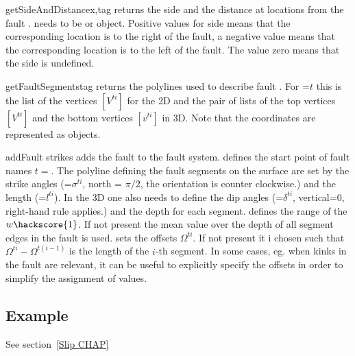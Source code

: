 \begin{methoddesc}[FaultSystem]{getSideAndDistance}{x,tag}
returns the side and the distance at locations  from the fault .
 needs to be \Vector or \numpyNDA object. Positive values for side means that the corresponding location is 
to the right of the fault, a negative value means that the corresponding location is 
to the left of the fault. The value zero means that the side is undefined.
\end{methoddesc}




\begin{methoddesc}[FaultSystem]{getFaultSegments}{tag}
returns the polylines used to describe fault . For =$t$ this is the list of the vertices
$[V^{ti}]$ for the 2D and the pair of lists of the top vertices $[V^{ti}]$ and the bottom vertices  $[v^{ti}]$ in 3D.
Note that the coordinates are represented as \numpyNDA objects.
\end{methoddesc}

\begin{methoddesc}[FaultSystem]{addFault}{
strikes}
adds the  fault  to the fault system. 
 defines the start point of fault names $t=$. The polyline
defining the fault segments on the surface are set 
by the strike angles  (=$\sigma^{ti}$, north = $\pi/2$, the orientation is counter clockwise.) and
the length  (=$l^{ti}$). In the 3D one also needs to define the 
dip angles  (=$\delta^{ti}$, vertical=$0$, right-hand rule applies.) and 
the depth  for each segment.
 defines the range of the $w\hackscore{1}$. If not present the mean value over the depth of 
all segment edges in the fault is used.
 sets the offsets $\Omega^{ti}$. If not present it i chosen such that $\Omega^{ti}-\Omega^{t(i-1)}$ is the length of the $i$-th segment. In some cases, eg. when kinks in the fault are relevant, it can be useful
to explicitly specify the offsets in order to simplify the assignment of values.
\end{methoddesc}

\subsection{Example}
See section~\ref{Slip CHAP}







